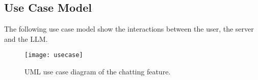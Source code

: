 \subsection{Use Case Model}


The following use case model show the interactions between the user, the server and the \ac{LLM}. 

\begin{figure}[h!]
    \centering
    \texttt{[image: usecase]}
    \caption{UML use case diagram of the chatting feature.}
\end{figure}


